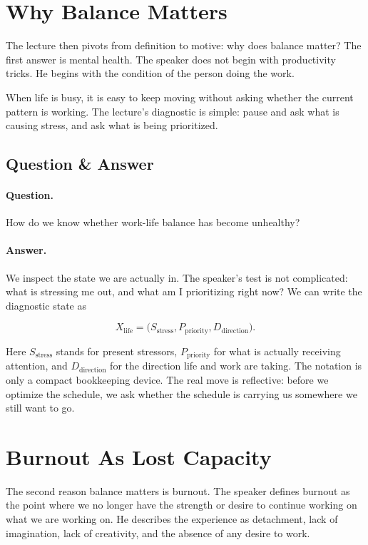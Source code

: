 \section{Why Balance Matters}

The lecture then pivots from definition to motive: why does balance matter? The first answer is mental health. The speaker does not begin with productivity tricks. He begins with the condition of the person doing the work.

When life is busy, it is easy to keep moving without asking whether the current pattern is working. The lecture's diagnostic is simple: pause and ask what is causing stress, and ask what is being prioritized.

\subsection{Question \& Answer}

\paragraph{Question.}
How do we know whether work-life balance has become unhealthy?

\paragraph{Answer.}
We inspect the state we are actually in. The speaker's test is not complicated: what is stressing me out, and what am I prioritizing right now? We can write the diagnostic state as

\begin{equation}
X_{\mathrm{life}}
=
\bigl(
S_{\mathrm{stress}},
P_{\mathrm{priority}},
D_{\mathrm{direction}}
\bigr).
\end{equation}

Here \(S_{\mathrm{stress}}\) stands for present stressors, \(P_{\mathrm{priority}}\) for what is actually receiving attention, and \(D_{\mathrm{direction}}\) for the direction life and work are taking. The notation is only a compact bookkeeping device. The real move is reflective: before we optimize the schedule, we ask whether the schedule is carrying us somewhere we still want to go.

\section{Burnout As Lost Capacity}

The second reason balance matters is burnout. The speaker defines burnout as the point where we no longer have the strength or desire to continue working on what we are working on. He describes the experience as detachment, lack of imagination, lack of creativity, and the absence of any desire to work.

